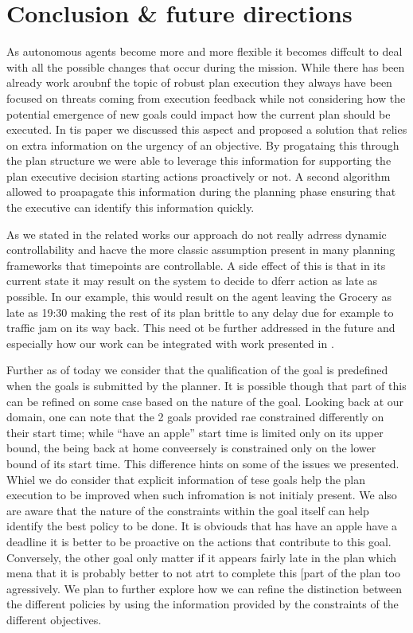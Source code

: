 
\section{Conclusion \& future directions}
\label{sec:conclude}



As autonomous agents become more and more flexible it becomes diffcult to deal with all the possible changes that occur during the mission. While there has been already work aroubnf the topic of robust plan execution they always have been focused on threats coming from execution feedback while not considering how the potential emergence 
of new goals could impact how the current plan should be executed. In tis paper we discussed this aspect and proposed a solution that relies on extra information on the urgency of an objective. By progataing this through the plan structure we were able to 
leverage this information for supporting the plan executive decision starting actions proactively or not. A second algorithm allowed to proapagate this information during the planning phase ensuring that the executive can identify this information quickly. 

As we stated in the related works our approach do not really adrress dynamic 
controllability and hacve the more classic assumption present in many planning 
frameworks that timepoints are controllable. A side effect of this is that in its current state it may result on the system to decide to dferr action as late as possible. In our example, this would result on the agent leaving the Grocery as late as 19:30 making the rest of its plan brittle to any delay due for example to traffic jam on its way back. This need ot be further addressed in the future and especially how our work can be integrated with work presented in \cite{morris01}. 

Further as of today we consider that the qualification of the goal is predefined when the goals is submitted by the planner. It is possible though that part of this can be refined on some case based on the nature  of the goal. Looking back at our domain, one can note that the 2 goals provided rae constrained differently on their start time; while ``have an  apple'' start time is limited only on its upper bound, the being back at home conveersely is constrained only on the lower bound of its start time. This difference hints on some of the issues we presented. Whiel we do consider that explicit information of tese goals help the plan execution to be improved when such infromation is not initialy present. We also are aware that the nature of the constraints within the goal itself can help identify the best policy to be done. It is obviouds that has have an apple have a deadline it is better to be proactive on the actions that contribute to this goal. Conversely, the other goal only matter if it appears fairly late in the plan which mena that it is probably better to not atrt to complete this [part of the plan too agressively. We plan to further explore how we can refine the distinction between the different policies by using the information provided by the constraints of the different objectives. 
 
